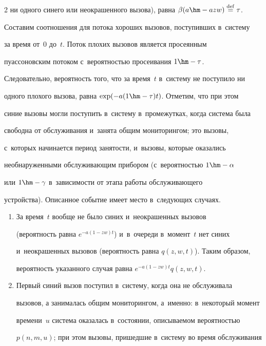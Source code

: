 \begin{multicols}{2}
ни одного синего или неокрашенного вызова), равна $\beta(a\hm- azw) 


\stackrel{\mathrm{def}}{=} \tau$.


  


  Составим соотношения для потока хороших вызовов, поступивших в~систему 


за время от~0 до~$t$. Поток плохих вызовов является просеянным 


пуассоновским потоком с~вероятностью просеивания $1\hm-\tau$. 


Следовательно, вероятность того, что за время~$t$ в~систему не поступило ни 


одного плохого вызова, равна $\exp (-a(1\hm- \tau)t)$. Отметим, что при этом 


синие вызовы могли поступить в~систему в~промежутках, когда система была 


свободна от обслуживания и~занята общим мониторингом; это вызовы, 


с~которых начинается период занятости, и~вызовы, которые оказались 


необнаруженными обслуживающим прибором (с~вероятностью $1\hm-\alpha$ 


или $1\hm-\gamma$ в~зависимости от этапа работы обслуживающего 


устройства). Описанное событие имеет место в~следующих случаях.\\[-14pt]


  \begin{enumerate}


  \item За время~$t$ вообще не было синих и~неокрашенных вызовов 


(вероятность равна $e^{-a(1-zw)t}$) и~в~очереди в~момент~$t$ нет синих 


и~неокрашенных вызовов (вероятность равна $q(z,w,t)$). Таким образом, 


вероятность указанного случая равна $e^{-a(1-zw)t} q(z,w,t)$.\\[-14pt]


  \item  Первый синий вызов поступил в~систему, когда она не обслуживала 


вызовов, а занималась общим мониторингом, а~именно: в~некоторый момент 


времени~$u$ система оказалась в~состоянии, описываемом вероятностью 


$p(n,m,u)$; при этом вызовы, пришедшие в~систему во время обслуживания 



\end{enumerate}
\end{multicols}
